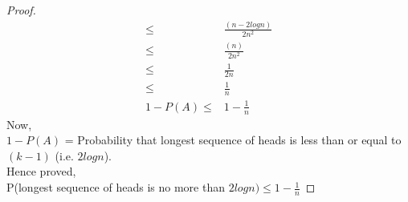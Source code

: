 \documentclass[12pt]{article}
\begin{document}
\begin{solution}
\begin{proof}
\begin{align*}
                \leq & \frac{(n-2logn)}{2n^2}\\
                \leq & \frac{(n)}{2n^2}\\
                \leq & \frac{1}{2n}\\\leq & \frac{1}{n}\\
                1-P(A)\leq & 1-\frac{1}{n}
            \end{align*}
            Now, \\$1-P(A)$ = Probability that longest sequence of heads is less than or equal to $(k-1)$ (i.e. $2logn$).\\ 
            Hence proved,\\ P(longest sequence of heads is no more than $2logn) \leq 1-\frac{1}{n}$ 
        \end{proof}
    \end{solution}
\end{document}
